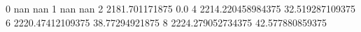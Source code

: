 0 nan nan
1 nan nan
2 2181.701171875 0.0
4 2214.220458984375 32.519287109375
6 2220.47412109375 38.77294921875
8 2224.279052734375 42.577880859375
